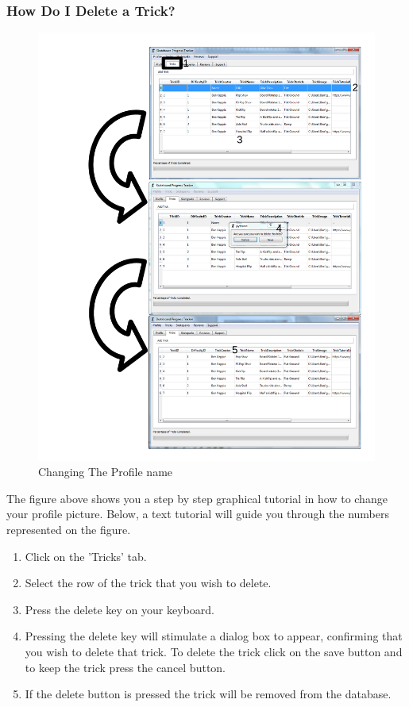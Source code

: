 \subsubsection{How Do I Delete a Trick?} \label{DeleteTrick}

\begin{figure}[H]
    \includegraphics[width=\textwidth]{./Manual/Images/DeleteTrick.pdf}
    \caption{Changing The Profile name} \label{fig:Change Name}
\end{figure}

The figure above shows you a step by step graphical tutorial in how to change your profile picture. Below, a text tutorial will guide you through the numbers represented on the figure.

\begin{enumerate}
\item Click on the 'Tricks' tab.
\item Select the row of the trick that you wish to delete.
\item Press the delete key on your keyboard.
\item Pressing the delete key will stimulate a dialog box to appear, confirming that you wish to delete that trick. To delete the trick click on the save button and to keep the trick press the cancel button.
\item If the delete button is pressed the trick will be removed from the database.
\end{enumerate}

